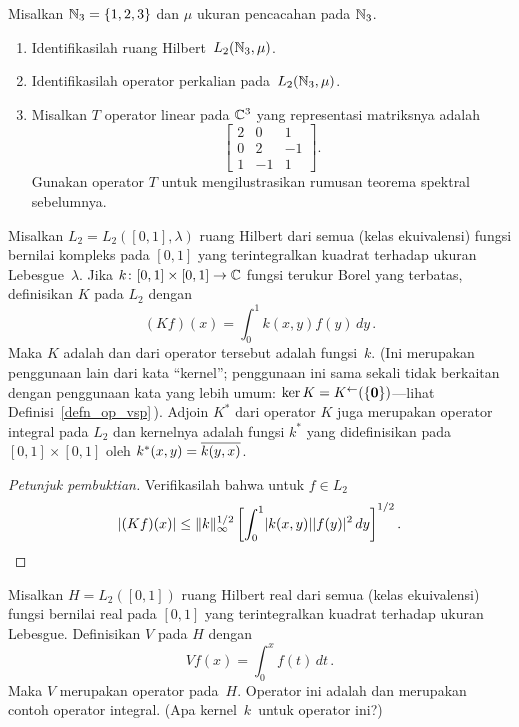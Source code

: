 \begin{exer} Misalkan $\mathbb{N}_3 = \{1,2,3\}$ dan $\mu$ ukuran pencacahan pada $\mathbb{N}_3$.
 \begin{enumerate}
  \item[(a)] Identifikasilah ruang Hilbert~$L_2(\mathbb{N}_3,\mu)$.
  \item[(b)] Identifikasilah operator perkalian pada~$L_2(\mathbb{N}_3,\mu)$.
  \item[(c)] Misalkan $T$ operator linear pada $\mathbb{C}^3$ yang representasi
matriksnya adalah
   \[ \begin{bmatrix}
          2  &  0  &  1 \\
          0  &  2  & -1 \\
          1  & -1  &  1
      \end{bmatrix}.\]
Gunakan operator $T$ untuk mengilustrasikan rumusan teorema spektral sebelumnya.
 \end{enumerate}
\end{exer}

\begin{exam}\label{exam_int_op} Misalkan $L_2 = L_2([0,1],\lambda)$ ruang Hilbert dari semua (kelas ekuivalensi)
fungsi bernilai kompleks pada $[0,1]$ yang terintegralkan kuadrat terhadap ukuran Lebesgue~$\lambda$.
Jika $k\colon [0,1] \times [0,1] \rightarrow \mathbb{C}$ fungsi terukur Borel yang terbatas, definisikan $K$ pada $L_2$ dengan
   \[ (Kf)(x) = \int_0^1 k(x,y)f(y)\,dy\,. \]
Maka $K$ adalah
 dan
 dari operator tersebut adalah fungsi~$k$. (Ini merupakan penggunaan lain dari kata ``kernel''; penggunaan ini sama sekali tidak berkaitan
dengan penggunaan kata yang lebih umum: $\ker K = K^{\gets}(\{\mathbf{0}\})$---lihat Definisi~\ref{defn_op_vsp}\,).
Adjoin $K^*$ dari operator $K$ juga merupakan operator integral pada $L_2$ dan
kernelnya adalah fungsi $k^*$ yang didefinisikan pada $[0,1] \times [0,1]$ oleh $k^*(x,y) = \overline{k(y,x)}$.
\end{exam}

\begin{proof}[\emph{Petunjuk pembuktian}] Verifikasilah bahwa untuk $f \in L_2$
   \[ \lvert(Kf)(x)\rvert \le \lVert k\rVert_\infty^{1/2}\left[ \int_0^1 \lvert k(x,y)\rvert\lvert f(y)\rvert^2\,dy\right]^{1/2}.\]
\ns
\end{proof}

\begin{exam}\label{000319} Misalkan $H = L_2([0,1])$ ruang Hilbert real dari semua (kelas ekuivalensi) fungsi
bernilai real pada $[0,1]$ yang terintegralkan kuadrat terhadap ukuran Lebesgue. Definisikan $V$ pada $H$ dengan
   \begin{equation}\label{000319i}
       Vf(x) = \int_0^x f(t)\,dt\,.
   \end{equation}
Maka $V$ merupakan operator pada~$H$. Operator ini adalah
 dan merupakan contoh operator integral. (Apa kernel~$k$\, untuk operator ini?)
\end{exam}

